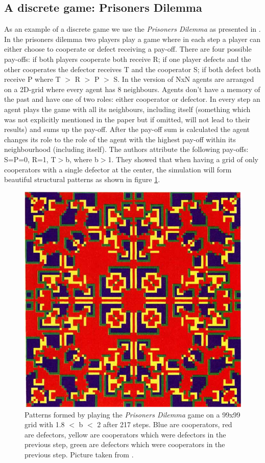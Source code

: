 \subsection{A discrete game: Prisoners Dilemma}
As an example of a discrete game we use the \textit{Prisoners Dilemma} as presented in \cite{nowak_evolutionary_1992}. In the prisoners dilemma two players play a game where in each step a player can either choose to cooperate or defect receiving a pay-off. There are four possible pay-offs: if both players cooperate both receive R; if one player defects and the other cooperates the defector receives T and the cooperator S; if both defect both receive P where T $>$ R $>$ P $>$ S.
In the version of \cite{nowak_evolutionary_1992} NxN agents are arranged on a 2D-grid where every agent has 8 neighbours. Agents don't have a memory of the past and have one of two roles: either cooperator or defector. In every step an agent plays the game with all its neighbours, including itself (something which was not explicitly mentioned in the paper but if omitted, will not lead to their results) and sums up the pay-off. After the pay-off sum is calculated the agent changes its role to the role of the agent with the highest pay-off within its neighbourhood (including itself). The authors attribute the following pay-offs: S=P=0, R=1, T$>$b, where b$>$1. They showed that when having a grid of only cooperators with a single defector at the center, the simulation will form beautiful structural patterns as shown in figure \ref{fig:sync_patterns}.

\begin{figure}
	\centering
	\includegraphics[width=.4\textwidth, angle=0]{./fig/sync_patterns.png}
	\caption{Patterns formed by playing the \textit{Prisoners Dilemma} game on a 99x99 grid with 1.8 $<$ b $<$ 2 after 217 steps. Blue are cooperators, red are defectors, yellow are cooperators which were defectors in the previous step, green are defectors which were cooperators in the previous step. Picture taken from \cite{nowak_evolutionary_1992}.}
	\label{fig:sync_patterns}
\end{figure}

